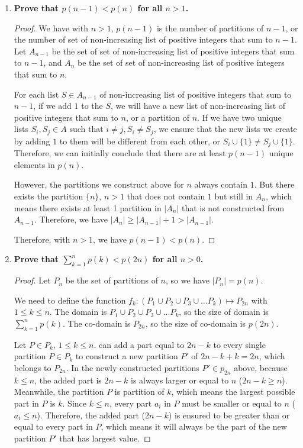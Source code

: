 \documentclass[10pt]{article}
\newcommand{\ds}{\displaystyle}
\begin{document}
\begin{enumerate}
\begin{enumerate}
In conclusion, we have:

$$|A| < |B|$$

\item \textbf{Prove that $p(n-1)<p(n)$ for all $n>1$.}

\begin{proof}
    We have with $n>1$, $p(n-1)$ is the number of partitions of $n-1$, or the number of set of non-increasing list of positive integers that sum to $n-1$. Let $A_{n-1}$ be the set of set of non-increasing list of positive integers that sum to $n-1$, and $A_{n}$ be the set of set of non-increasing list of positive integers that sum to $n$.

    For each list $S \in A_{n-1}$ of non-increasing list of positive integers that sum to $n-1$, if we add $1$ to the $S$, we will have a new list of non-increasing list of positive integers that sum to $n$, or a partition of $n$. If we have two unique lists $S_i, S_j \in A$ such that $i \neq j, S_i \neq S_j$, we ensure that the new lists we create by adding $1$ to them will be different from each other, or $S_i \cup \{1\} \neq S_j \cup \{1\}$. Therefore, we can initially conclude that there are at least $p(n-1)$  unique elements in $p(n)$.
    
    However, the partitions we construct above for $n$ always contain $1$. But there exists the partition $\{n\}$, $n > 1$ that does not contain $1$ but still in $A_n$, which means there exists at least 1 partition in $|A_n|$ that is not constructed from $A_{n-1}$. Therefore, we have $|A_n| \geq |A_{n-1}|+1>|A_{n-1}|$.

    Therefore, with $n > 1$, we have $p(n-1) < p(n)$.
    
\end{proof}


\item \textbf{Prove that $\ds\sum_{k=1}^{n}p(k)<p(2n)$ for all $n>0$.}

\begin{proof}
    Let $P_n$ be the set of partitions of $n$, so we have $|P_n|=p(n)$. 

    We need to define the function $f_k: (P_1 \cup P_2\cup P_3 \cup \ldots P_k) \mapsto P_{2n}$ with $1\leq k \leq n$. The domain is $P_1 \cup P_2\cup P_3 \cup \ldots P_k$, so the size of domain is $\ds\sum_{k=1}^{n}p(k)$. The co-domain is $P_{2n}$, so the size of co-domain is $p(2n)$.
    
    Let $P \in P_k$, $1 \leq k \leq n$. can add a part equal to $2n-k$ to every single partition $P \in P_k$ to construct a new partition $P'$ of $2n -k + k = 2n$, which belongs to $P_{2n}$. In the newly constructed partitions $P' \in p_{2n}$ above, because $k \leq n$, the added part is $2n - k$ is always larger or equal to $n$ ($2n-k \geq n$). Meanwhile, the partition $P$ is partition of $k$, which means the largest possible part in $P$ is $k$. Since $k \leq n$, every part $a_i$ in $P$ must be smaller or equal to $n$ ($a_i \leq n$). Therefore, the added part ($2n - k$) is ensured to be greater than or equal to every part in $P$, which means it will always be the part of the new partition $P'$ that has largest value. 


\end{proof}
\end{enumerate}
\end{enumerate}
\end{document}
